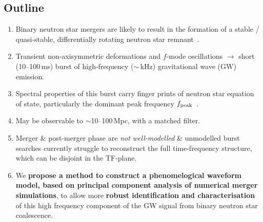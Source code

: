 \documentclass[a0,landscape]{a0poster}
\def\gw#1{gravitational wave#1 (GW#1)\gdef\gw{GW}}
\begin{document}
\begin{multicols}{4}



\color{DarkSlateGray} %

\section*{\centering Outline}

\begin{enumerate}
\item Binary neutron star mergers are likely to result in the formation of a
    stable / quasi-stable, differentially rotating neutron star
    remnant~\cite{shibata:06bns, giacomazzo:11, hotokezaka:11, bauswein:12}.
\item Transient non-axisymmetric deformations and $f$-mode oscillations
    $\rightarrow$ short (10--100\,ms) burst of high-frequency ($\sim $\,kHz)
    \gw{} emission.
\item Spectral properties of this burst carry finger prints of neutron star
    equation of state, particularly the dominant peak frequency $f_{\rm
    peak}$~\cite{hotokezaka:13,Bauswein38Eos}.
\item May be observable to $\sim$10--100\,Mpc, with a matched filter.
\item Merger \& post-merger phase are \emph{not well-modelled} \& unmodelled
    burst searches currently struggle to reconstruct the full time-frequency
    structure, which can be disjoint in the TF-plane.
\item We {\bf propose a method to construct a phenomelogical waveform model,
    based on principal component analysis of numerical merger simulations},
    to allow more {\bf robust identification and characterisation} of this
    high frequency component of the \gw{} signal from binary neutron star coalescence.
\end{enumerate}



\end{multicols}
\end{document}
